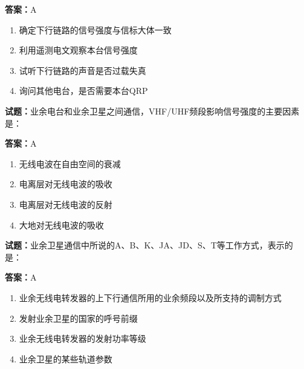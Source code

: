 \documentclass{ctexbook}
\begin{document}
\textbf{答案：}A 

\begin{enumerate}[leftmargin=3em]
  \item 确定下行链路的信号强度与信标大体一致 

  \item 利用遥测电文观察本台信号强度 

  \item 试听下行链路的声音是否过载失真 

  \item 询问其他电台，是否需要本台QRP 

\end{enumerate}





\vspace{1em}

\textbf{试题：}业余电台和业余卫星之间通信，VHF/UHF频段影响信号强度的主要因素是： 

\textbf{答案：}A 

\begin{enumerate}[leftmargin=3em]
  \item 无线电波在自由空间的衰减 

  \item 电离层对无线电波的吸收 

  \item 电离层对无线电波的反射 

  \item 大地对无线电波的吸收 

\end{enumerate}





\vspace{1em}

\textbf{试题：}业余卫星通信中所说的A、B、K、JA、JD、S、T等工作方式，表示的是： 

\textbf{答案：}A 

\begin{enumerate}[leftmargin=3em]
  \item 业余无线电转发器的上下行通信所用的业余频段以及所支持的调制方式 

  \item 发射业余卫星的国家的呼号前缀 


  \item 业余无线电转发器的发射功率等级 

  \item 业余卫星的某些轨道参数 

\end{enumerate}
\end{document}
